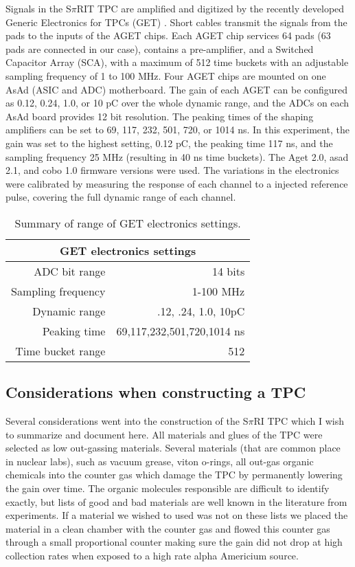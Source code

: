 Signals in the S$\pi$RIT TPC are amplified and digitized by the recently developed Generic Electronics for TPCs (GET) \cite{get}.  Short cables transmit the signals from the pads to the inputs of the AGET chips. Each AGET chip services 64 pads (63 pads are connected in our case), contains a pre-amplifier, and a Switched Capacitor Array (SCA), with a maximum of 512 time buckets with an adjustable sampling frequency of 1 to 100 MHz. Four AGET chips are mounted on one AsAd (ASIC and ADC) motherboard. The gain of each AGET can be configured as 0.12, 0.24, 1.0, or 10 pC over the whole dynamic range, and the ADCs on each AsAd board provides 12 bit resolution. The peaking times of the shaping amplifiers can be set to 69, 117, 232, 501, 720, or 1014 ns. In this experiment, the gain was set to the highest setting, 0.12 pC, the peaking time 117 ns, and the sampling frequency 25 MHz (resulting in 40 ns time buckets). The Aget 2.0, asad 2.1, and cobo 1.0 firmware versions were used. The variations in the electronics were calibrated by measuring the response of each channel to a injected reference pulse, covering the full dynamic range of each channel. 


\begin{table*}\centering
{}
\begin{tabular}{@{}rr@{}}\toprule 
\multicolumn{2}{c}{GET electronics settings}\\
\midrule
ADC bit range       & 14 bits \\
Sampling frequency  & 1-100 MHz \\
Dynamic range       & .12, .24, 1.0, 10pC \\
Peaking time        & 69,117,232,501,720,1014 ns \\
Time bucket range   & 512\\
\bottomrule
\end{tabular}
\caption{Summary of range of GET electronics settings. }
\label{tb:getoverview}
\end{table*}

\subsection{Considerations when constructing a TPC}
Several considerations went into the construction of the S$\pi$RI TPC which I wish to summarize and document here. All materials and glues of the TPC were selected as low out-gassing materials. Several materials (that are common place in nuclear labs), such as vacuum grease, viton o-rings, all out-gas organic chemicals into the counter gas which damage the TPC by permanently lowering the gain over time. The organic molecules responsible are difficult to identify exactly, but lists of good and bad materials are well known in the literature from experiments. If a material we wished to used was not on these lists we placed the material in a clean chamber with the counter gas and flowed this counter gas through a small proportional counter making sure the gain did not drop at high collection rates when exposed to a high rate alpha Americium source. 

